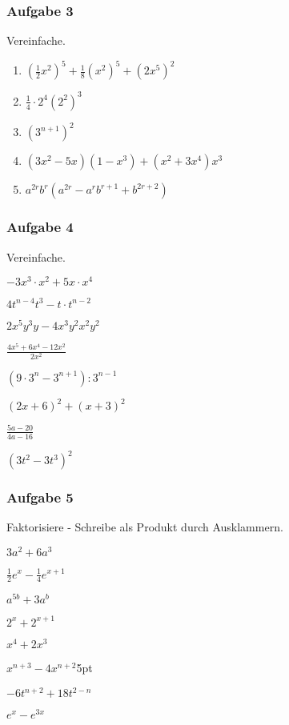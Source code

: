 \subsubsection{Aufgabe 3}
Vereinfache.
\begin{enumerate}
	\item \quad $ \left(\frac{1}{2}x^2\right)^5 + \frac{1}{8}(x^2)^5 + (2x^5)^2 $
	\item \quad $ \frac{1}{4} \cdot 2^4(2^2)^3 $
	\item \quad $ (3^{n+1})^2 $
	\item \quad $ (3x^2 - 5x)(1-x^3) + (x^2 + 3x^4)x^3 $
	\item \quad $ a^{2r}b^r(a^{2r} - a^rb^{r+1} + b^{2r+2}) $
\end{enumerate}

\subsubsection{Aufgabe 4}
Vereinfache.
\begin{enumerate}
\begin{multicols}{2}
	\item \quad $ -3x^3 \cdot x^2 + 5x \cdot x^4 $
	\item \quad $ 4t^{n-4}t^3-t \cdot t^{n-2} $
	\item \quad $ 2x^5y^3y - 4x^3y^2x^2y^2 $
	\item \quad $ \frac{4x^5 + 6x^4 -12x^2}{2x^2} $
	\item \quad $ (9 \cdot 3^n - 3^{n+1}) : 3^{n-1} $
	\item \quad $ (2x+6)^2+(x+3)^2 $
	\item \quad $ \frac{5a-20}{4a-16} $
	\item \quad $ (3t^2 - 3t^3)^2 $
\end{multicols}
\end{enumerate}

\newpage

\subsubsection{Aufgabe 5}
Faktorisiere - Schreibe als Produkt durch Ausklammern.
\begin{enumerate}
\begin{multicols}{2}
	\item \quad $ 3a^2 + 6a^3 $
	\item \quad $ \frac{1}{2}e^x - \frac{1}{4}e^{x+1} $
	\item \quad $ a^{5b} + 3a^b $
	\item \quad $ 2^x + 2^{x+1} $
	\item \quad $ x^4+2x^3 $
	\item \quad $ x^{n+3} - 4x^{n+2} $5pt
	\item \quad $ -6t^{n+2}+18t^{2-n} $
	\item \quad $ e^x-e^{3x} $
\end{multicols}
\end{enumerate}

